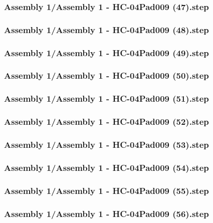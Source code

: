 \documentclass[a4paper,12pt]{article}
\begin{document}
\begin{lstlising}[language=C++]
\subsubsection{Assembly 1/Assembly 1 - HC-04Pad009 (47).step}

\subsubsection{Assembly 1/Assembly 1 - HC-04Pad009 (48).step}

\subsubsection{Assembly 1/Assembly 1 - HC-04Pad009 (49).step}

\subsubsection{Assembly 1/Assembly 1 - HC-04Pad009 (50).step}

\subsubsection{Assembly 1/Assembly 1 - HC-04Pad009 (51).step}

\subsubsection{Assembly 1/Assembly 1 - HC-04Pad009 (52).step}

\subsubsection{Assembly 1/Assembly 1 - HC-04Pad009 (53).step}

\subsubsection{Assembly 1/Assembly 1 - HC-04Pad009 (54).step}

\subsubsection{Assembly 1/Assembly 1 - HC-04Pad009 (55).step}

\subsubsection{Assembly 1/Assembly 1 - HC-04Pad009 (56).step}


\end{lstlising}
\end{document}
